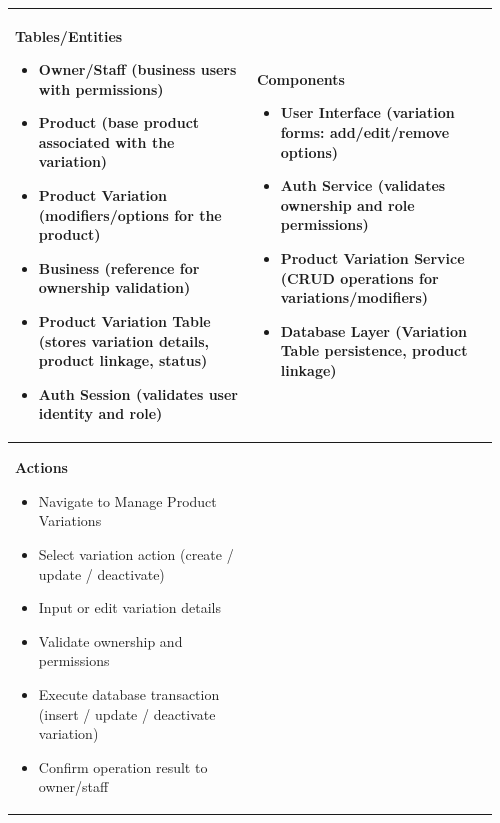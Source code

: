 \documentclass[]{VUMIFTemplateClass}
\newenvironment{mpitemlist}[1][\linewidth]{%
    \begin{minipage}[t]{#1}%
        \setlength{\leftmargini}{12pt}%
        \begin{itemize}%
            \setlength{\itemsep}{1pt}%
            \setlength{\parskip}{0pt}%
            \setlength{\parsep}{0pt}%
}{%
        \end{itemize}%
    \end{minipage}\newline
}
\begin{document}
\begin{center}
\setlength{\tabcolsep}{8pt}
\begin{tabular}{|p{0.48\linewidth}|p{0.48\linewidth}|}
\hline
\textbf{Tables/Entities} \newline
\begin{mpitemlist}
\item Owner/Staff (business users with permissions)
\item Product (base product associated with the variation)
\item Product Variation (modifiers/options for the product)
\item Business (reference for ownership validation)
\item Product Variation Table (stores variation details, product linkage, status)
\item Auth Session (validates user identity and role)
\end{mpitemlist}
&
\textbf{Components} \newline
\begin{mpitemlist}
\item User Interface (variation forms: add/edit/remove options)
\item Auth Service (validates ownership and role permissions)
\item Product Variation Service (CRUD operations for variations/modifiers)
\item Database Layer (Variation Table persistence, product linkage)
\end{mpitemlist}
\\ \hline
\textbf{Actions} \newline
\begin{mpitemlist}
\item Navigate to Manage Product Variations
\item Select variation action (create / update / deactivate)
\item Input or edit variation details
\item Validate ownership and permissions
\item Execute database transaction (insert / update / deactivate variation)
\item Confirm operation result to owner/staff
\end{mpitemlist}
&

\\ \hline
\end{tabular}
\end{center}
\end{document}
